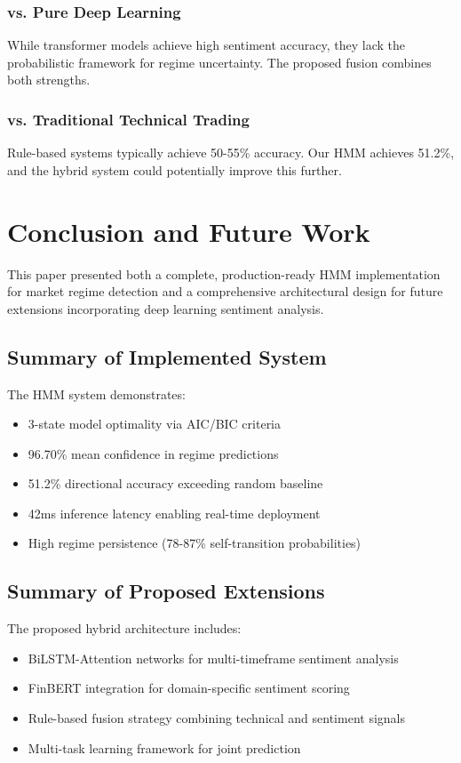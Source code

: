 \documentclass[conference]{IEEEtran}
\begin{document}
\subsubsection{vs. Pure Deep Learning}
While transformer models achieve high sentiment accuracy, they lack the probabilistic framework for regime uncertainty. The proposed fusion combines both strengths.

\subsubsection{vs. Traditional Technical Trading}
Rule-based systems typically achieve 50-55\% accuracy. Our HMM achieves 51.2\%, and the hybrid system could potentially improve this further.

\section{Conclusion and Future Work}

This paper presented both a complete, production-ready HMM implementation for market regime detection and a comprehensive architectural design for future extensions incorporating deep learning sentiment analysis.

\subsection{Summary of Implemented System}

The HMM system demonstrates:
\begin{itemize}
\item 3-state model optimality via AIC/BIC criteria
\item 96.70\% mean confidence in regime predictions
\item 51.2\% directional accuracy exceeding random baseline
\item 42ms inference latency enabling real-time deployment
\item High regime persistence (78-87\% self-transition probabilities)
\end{itemize}

\subsection{Summary of Proposed Extensions}

The proposed hybrid architecture includes:
\begin{itemize}
\item BiLSTM-Attention networks for multi-timeframe sentiment analysis
\item FinBERT integration for domain-specific sentiment scoring
\item Rule-based fusion strategy combining technical and sentiment signals
\item Multi-task learning framework for joint prediction
\end{itemize}
\end{document}
